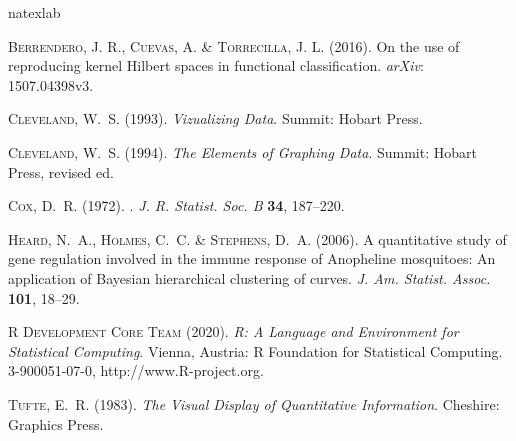 \documentclass[supplementary,lineno]{biometrika}
\begin{document}
\begin{thebibliography}{7}
\expandafter\ifx\csname natexlab\endcsname\relax\def\natexlab#1{#1}\fi

\textsc{Berrendero, J. R., Cuevas, A. \& Torrecilla, J. L.} (2016).
\newblock On the use of reproducing kernel Hilbert spaces in functional
  classification.
\newblock \textit{arXiv}: 1507.04398v3.

\textsc{Cleveland, W.~S.} (1993).
\newblock \textit{{Vizualizing Data}}.
\newblock Summit: Hobart Press.

\textsc{Cleveland, W.~S.} (1994).
\newblock \textit{{The Elements of Graphing Data}}.
\newblock Summit: Hobart Press, revised ed.

\textsc{Cox, D.~R.} (1972).
.
\newblock \textit{J. R. Statist. Soc. {\rm B}} \textbf{34}, 187--220.

\textsc{Heard, N.~A.}, \textsc{Holmes, C.~C.} \& \textsc{Stephens, D.~A.}
  (2006).
\newblock A quantitative study of gene regulation involved in the immune
  response of {A}nopheline mosquitoes: {A}n application of {B}ayesian
  hierarchical clustering of curves.
\newblock \textit{J. Am. Statist. Assoc.} \textbf{101}, 18--29.

\textsc{{R Development Core Team}} (2020).
\newblock \textit{R: A Language and Environment for Statistical Computing}.
\newblock Vienna, Austria: R Foundation for Statistical Computing.
 3-900051-07-0, http://www.R-project.org.

\textsc{Tufte, E.~R.} (1983).
\newblock \textit{{The Visual Display of Quantitative Information}}.
\newblock Cheshire: Graphics Press.

\end{thebibliography}
\end{document}
